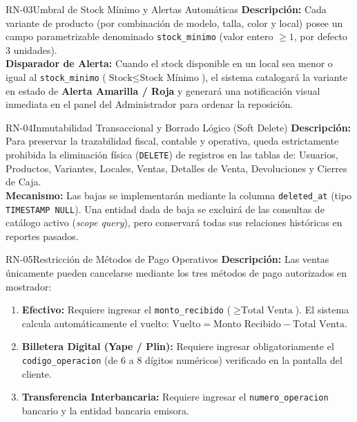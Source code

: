 \begin{rnbox}{RN-03}{Umbral de Stock Mínimo y Alertas Automáticas}
\textbf{Descripción:} Cada variante de producto (por combinación de modelo, talla, color y local) posee un campo parametrizable denominado \texttt{stock\_minimo} (valor entero $\ge 1$, por defecto 3 unidades).\\
\textbf{Disparador de Alerta:} Cuando el stock disponible en un local sea menor o igual al \texttt{stock\_minimo} ($\text{Stock} \le \text{Stock Mínimo}$), el sistema catalogará la variante en estado de \textbf{Alerta Amarilla / Roja} y generará una notificación visual inmediata en el panel del Administrador para ordenar la reposición.
\end{rnbox}

\begin{rnbox}{RN-04}{Inmutabilidad Transaccional y Borrado Lógico (Soft Delete)}
\textbf{Descripción:} Para preservar la trazabilidad fiscal, contable y operativa, queda estrictamente prohibida la eliminación física (\texttt{DELETE}) de registros en las tablas de: Usuarios, Productos, Variantes, Locales, Ventas, Detalles de Venta, Devoluciones y Cierres de Caja.\\
\textbf{Mecanismo:} Las bajas se implementarán mediante la columna \texttt{deleted\_at} (tipo \texttt{TIMESTAMP NULL}). Una entidad dada de baja se excluirá de las consultas de catálogo activo (\textit{scope query}), pero conservará todas sus relaciones históricas en reportes pasados.
\end{rnbox}

\begin{rnbox}{RN-05}{Restricción de Métodos de Pago Operativos}
\textbf{Descripción:} Las ventas únicamente pueden cancelarse mediante los tres métodos de pago autorizados en mostrador:
\begin{enumerate}[leftmargin=*,noitemsep]
    \item \textbf{Efectivo:} Requiere ingresar el \texttt{monto\_recibido} ($\ge \text{Total Venta}$). El sistema calcula automáticamente el vuelto: $\text{Vuelto} = \text{Monto Recibido} - \text{Total Venta}$.
    \item \textbf{Billetera Digital (Yape / Plin):} Requiere ingresar obligatoriamente el \texttt{codigo\_operacion} (de 6 a 8 dígitos numéricos) verificado en la pantalla del cliente.
    \item \textbf{Transferencia Interbancaria:} Requiere ingresar el \texttt{numero\_operacion} bancario y la entidad bancaria emisora.
\end{enumerate}
\end{rnbox}

